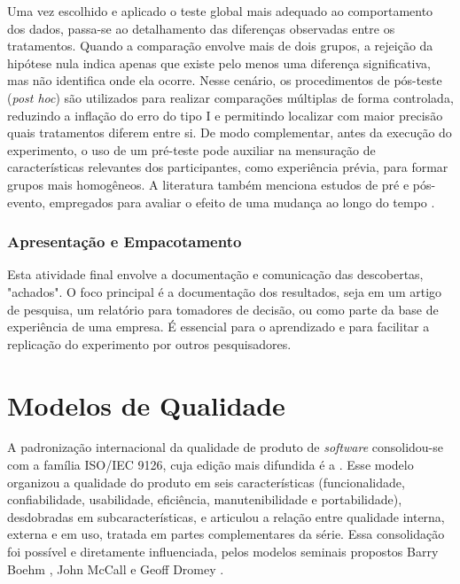 Uma vez escolhido e aplicado o teste global mais adequado ao comportamento dos dados, passa-se ao detalhamento das diferenças observadas entre os tratamentos. Quando a comparação envolve mais de dois grupos, a rejeição da hipótese nula indica apenas que existe pelo menos uma diferença significativa, mas não identifica onde ela ocorre. Nesse cenário, os procedimentos de pós-teste (\textit{post hoc}) são utilizados para realizar comparações múltiplas de forma controlada, reduzindo a inflação do erro do tipo I e permitindo localizar com maior precisão quais tratamentos diferem entre si. De modo complementar, antes da execução do experimento, o uso de um pré-teste pode auxiliar na mensuração de características relevantes dos participantes, como experiência prévia, para formar grupos mais homogêneos. A literatura também menciona estudos de pré e pós-evento, empregados para avaliar o efeito de uma mudança ao longo do tempo \cite{Wohlin:2012:ESE:2349018}.

\subsubsection{Apresentação e Empacotamento}
Esta atividade final envolve a documentação e comunicação das descobertas, "achados".
O foco principal é a documentação dos resultados, seja em um artigo de pesquisa, um relatório para tomadores de decisão, ou 
como parte da base de experiência de uma empresa. É essencial para o aprendizado e para facilitar a replicação do experimento 
por outros pesquisadores.


\section{Modelos de Qualidade}



A padronização internacional da qualidade de produto de \textit{software} consolidou-se com a família ISO/IEC 9126, cuja edição mais difundida é 
a . Esse modelo organizou a qualidade do produto em seis características (funcionalidade, confiabilidade, usabilidade, 
eficiência, manutenibilidade e portabilidade), desdobradas em subcaracterísticas, e articulou a relação entre qualidade interna, externa e 
em uso, tratada em partes complementares da série. Essa consolidação foi possível e diretamente influenciada, pelos modelos seminais propostos Barry Boehm \cite{boehm1978characteristics}, John McCall \cite{McCall77} e Geoff Dromey \cite{Dromey1995}.



